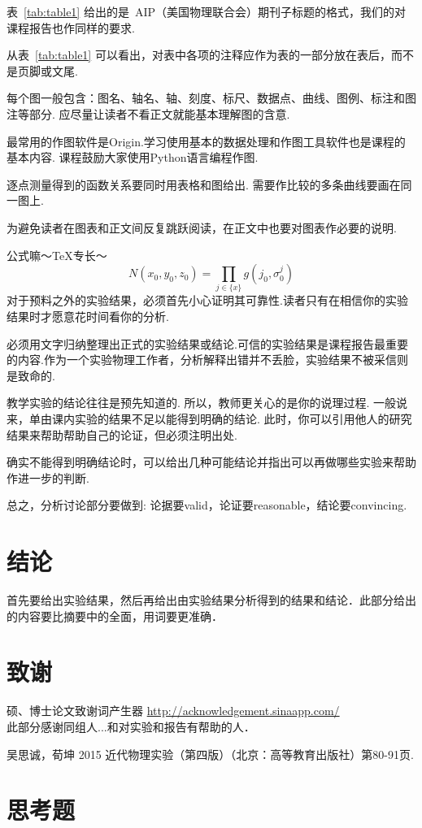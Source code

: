 \documentclass[aps,pre,12pt,preprint,onecolumn,showpacs,showkeys]{revtex4-1}
\begin{document}
表~\ref{tab:table1} 给出的是~AIP（美国物理联合会）期刊子标题的格式，我们的对课程报告也作同样的要求.\par
从表~\ref{tab:table1} 可以看出，对表中各项的注释应作为表的一部分放在表后，而不是页脚或文尾.\par
每个图一般包含：图名、轴名、轴、刻度、标尺、数据点、曲线、图例、标注和图注等部分. 应尽量让读者不看正文就能基本理解图的含意.\par
最常用的作图软件是Origin.学习使用基本的数据处理和作图工具软件也是课程的基本内容. 课程鼓励大家使用Python语言编程作图.\par
逐点测量得到的函数关系要同时用表格和图给出. 需要作比较的多条曲线要画在同一图上.\par
为避免读者在图表和正文间反复跳跃阅读，在正文中也要对图表作必要的说明.\par
公式嘛～TeX专长～
\begin{equation}
N(x_0,y_0,z_0)=\prod_{j\in\{x\}}g(j_0,\sigma^j_0) \label{eq:1}
\end{equation}
对于预料之外的实验结果，必须首先小心证明其可靠性.读者只有在相信你的实验结果时才愿意花时间看你的分析.\par
必须用文字归纳整理出正式的实验结果或结论.可信的实验结果是课程报告最重要的内容.作为一个实验物理工作者，分析解释出错并不丢脸，实验结果不被采信则是致命的.\par
教学实验的结论往往是预先知道的. 所以，教师更关心的是你的说理过程. 一般说来，单由课内实验的结果不足以能得到明确的结论. 此时，你可以引用他人的研究结果来帮助帮助自己的论证，但必须注明出处. \par
确实不能得到明确结论时，可以给出几种可能结论并指出可以再做哪些实验来帮助作进一步的判断.\par
总之，分析讨论部分要做到: 论据要valid，论证要reasonable，结论要convincing.\par

\section{结论}
首先要给出实验结果，然后再给出由实验结果分析得到的结果和结论．此部分给出的内容要比摘要中的全面，用词要更准确．\par

\section{致谢}
硕、博士论文致谢词产生器 \href{http://acknowledgement.sinaapp.com/}{http://acknowledgement.sinaapp.com/}\\
此部分感谢同组人...和对实验和报告有帮助的人．
%
\begin{thebibliography}{}
 吴思诚，荀坤 2015 近代物理实验（第四版）（北京：高等教育出版社）第80-91页.

\end{thebibliography}

\clearpage
\appendix
\section{思考题}
\end{document}
